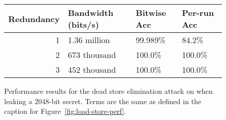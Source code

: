 \begin{figure}
  \small
  \begin{tabular}{ r | l | l | l }
    Redundancy & Bandwidth (bits/s) & Bitwise Acc & Per-run Acc \\ \hline
    1          & 1.36 million       & 99.989\%    & 84.2\%      \\
    2          & 673 thousand       & 100.0\%     & 100.0\%     \\
    3          & 452 thousand       & 100.0\%     & 100.0\%     \\
  \end{tabular}
  \caption{
    Performance results for the dead store elimination attack on {\CLANG} when
    leaking a 2048-bit secret.
    Terms are the same as defined in the caption for Figure~\ref{fig:load-store-perf}.
  }
  \label{fig:clang-dse-perf}
\end{figure}

